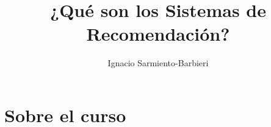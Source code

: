 \documentclass[
  shownotes,
  xcolor={svgnames},
  hyperref={colorlinks,citecolor=DarkBlue,linkcolor=Black,urlcolor=DarkBlue}
  , aspectratio=169]{beamer}
\begin{document}
\title[MLAM]{¿Qué son los Sistemas de Recomendación?}

\date{}

\author[Sarmiento-Barbieri]{Ignacio Sarmiento-Barbieri}



\begin{frame}[noframenumbering]
\maketitle
\end{frame}
    
\section{Sobre el curso}
\end{document}
